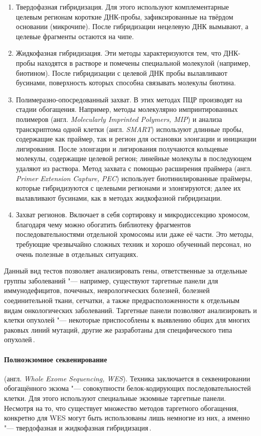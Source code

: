 \documentclass[a4paper,14pt]{extarticle}
\newcommand{\engterm}[1]{англ. \textenglish{\textit{#1}}}
\begin{document}
\begin{enumerate}
	\item Твердофазная гибридизация.
	      Для этого используют комплементарные целевым регионам короткие ДНК-пробы, зафиксированные на твёрдом основании (микрочипе).
	      После гибридизации нецелевую ДНК вымывают, а целевые фрагменты остаются на чипе.
	\item Жидкофазная гибридизация.
	      Эти методы характеризуются тем, что ДНК-пробы находятся в растворе и помечены специальной молекулой (например, биотином).
	      После гибридизации с целевой ДНК пробы вылавливают бусинами, поверхность которых способна связывать молекулы биотина.
	\item Полимеразно-опосредованный захват.
	      В этих методах ПЦР производят на стадии обогащения.
	      Например, методы молекулярно импринтированных полимеров (\engterm{Molecularly Imprinted Polymers, MIP}) и анализа транскриптома одной клетки (\engterm{SMART}) используют длинные пробы, содержащие как праймер, так и регион для остановки элонгации и инициации лигирования.
	      После элонгации и лигирования получаются кольцевые молекулы, содержащие целевой регион;
	      линейные молекулы в последующем удаляют из раствора.
	      Метод захвата с помощью расширения праймера (\engterm{Primer Extension Capture, PEC}) использует биотинилированные праймеры, которые гибридизуются с целевыми регионами и элонгируются;
	      далее их вылавливают бусинами, как в методах жидкофазной гибридизации.
	\item Захват регионов.
	      Включает в себя сортировку и микродиссекцию хромосом, благодаря чему можно обогатить библиотеку фрагментов последовательностями отдельной хромосомы или даже её части.
	      Это методы, требующие чрезвычайно сложных техник и хорошо обученный персонал, но очень полезные в отдельных ситуациях.
\end{enumerate}

Данный вид тестов позволяет анализировать гены, ответственные за отдельные группы заболеваний "--- например, существуют таргетные панели для иммунодефицитов, почечных, неврологических болезней, болезней соединительной ткани, сетчатки, а также предрасположенности к отдельным видам онкологических заболеваний.
Таргетные панели позволяют анализировать и клетки опухолей "--- некоторые приспособлены к выявлению общих для многих раковых линий мутаций, другие же разработаны для специфического типа опухолей\,\citep{Yohe_2017}.

\paragraph{Полноэкзомное секвенирование} (\engterm{Whole Exome Sequencing, WES}).
Техника заключается в секвенировании обогащённого экзома "--- совокупности белок-кодирующих последовательностей клетки.
Для этого используют специальные экзомные таргетные панели.
Несмотря на то, что существует множество методов таргетного обогащения, конкретно для WES могут быть использованы лишь немногие из них, а именно "--- твердофазная и жидкофазная гибридизация\,\citep{Teer_2010}.
\end{document}
